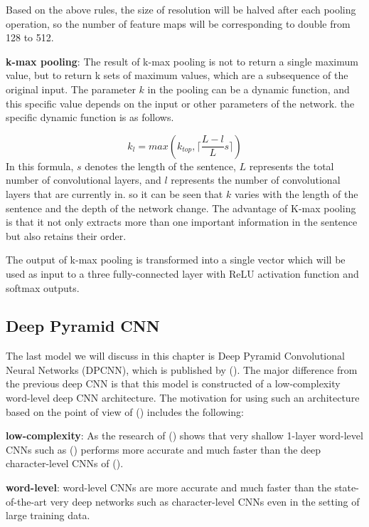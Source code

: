 \documentclass[]{krantz}
\begin{document}
Based on the above rules, the size of resolution will be halved after each pooling operation, so the number of feature maps will be corresponding to double from 128 to 512.

\textbf{k-max pooling}: The result of k-max pooling is not to return a single maximum value, but to return k sets of maximum values, which are a subsequence of the original input. The parameter \(k\) in the pooling can be a dynamic function, and this specific value depends on the input or other parameters of the network. the specific dynamic function is as follows.

\[k_{l}=max(k_{top},\lceil \frac{L-l}{L}s \rceil)\]
In this formula, \(s\) denotes the length of the sentence, \(L\) represents the total number of convolutional layers, and \(l\) represents the number of convolutional layers that are currently in. so it can be seen that \(k\) varies with the length of the sentence and the depth of the network change. The advantage of K-max pooling is that it not only extracts more than one important information in the sentence but also retains their order.

The output of k-max pooling is transformed into a single vector which will be used as input to a three fully-connected layer with ReLU activation function and softmax outputs.

\hypertarget{deep-pyramid-cnn}{%
\subsection{Deep Pyramid CNN}\label{deep-pyramid-cnn}}

The last model we will discuss in this chapter is Deep Pyramid Convolutional Neural Networks (DPCNN), which is published by (\citet{Johnson2017DeepPC}). The major difference from the previous deep CNN is that this model is constructed of a low-complexity word-level deep CNN architecture. The motivation for using such an architecture based on the point of view of (\citet{Johnson2017DeepPC}) includes the following:

\textbf{low-complexity}: As the research of (\citet{Johnson2016ConvolutionalNN}) shows that very shallow 1-layer word-level CNNs such as (\citet{Kim2014ConvolutionalNN}) performs more accurate and much faster than the deep character-level CNNs of (\citet{Schwenk2017VeryDC}).

\textbf{word-level}: word-level CNNs are more accurate and much faster than the state-of-the-art very deep networks such as character-level CNNs even in the setting of large training data.
\end{document}
